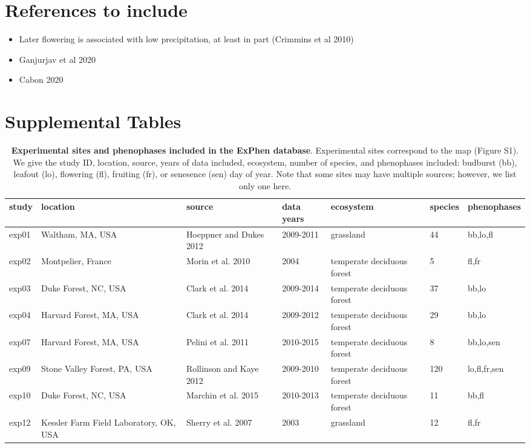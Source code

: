 \documentclass{article}
\begin{document}
\section*{References to include}
\begin{itemize}
\item Later flowering is  associated with low precipitation, at least in part (Crimmins et al 2010)
\item Ganjurjav et al 2020
\item Cabon 2020
\end{itemize}

\clearpage
\section* {Supplemental Tables}

\begin{table}[ht]
\centering
\caption{\textbf{Experimental sites and phenophases included in the ExPhen database}. Experimental sites correspond to the map (Figure S1). We give the study ID, location, source, years of data included, ecosystem, number of species, and phenophases included: budburst (bb), leafout (lo), flowering (fl), fruiting (fr), or senesence (sen) day of year. Note that some sites may have multiple sources; however, we list only one here.} 
\label{tab:studylocs}
\begingroup\footnotesize
\begin{tabular}{|p{}|p{}|p{}|p{}|p{}|p{}|p{}|}
  \hline
study & location & source & data years & ecosystem & species & phenophases \\ 
  \hline
exp01 & Waltham, MA, USA & Hoeppner and Dukes 2012 & 2009-2011 & grassland & 44 & bb,lo,fl \\ 
   \hline
exp02 & Montpelier, France & Morin et al. 2010 & 2004 & temperate deciduous forest & 5 & fl,fr \\ 
   \hline
exp03 & Duke Forest, NC, USA & Clark et al. 2014 & 2009-2014 & temperate deciduous forest & 37 & bb,lo \\ 
   \hline
exp04 & Harvard Forest, MA, USA & Clark et al. 2014 & 2009-2012 & temperate deciduous forest & 29 & bb,lo \\ 
   \hline
exp07 & Harvard Forest, MA, USA & Pelini et al. 2011 & 2010-2015 & temperate deciduous forest & 8 & bb,lo,sen \\ 
   \hline
exp09 & Stone Valley Forest, PA, USA & Rollinson and Kaye 2012 & 2009-2010 & temperate deciduous forest & 120 & lo,fl,fr,sen \\ 
   \hline
exp10 & Duke Forest, NC, USA & Marchin et al. 2015 & 2010-2013 & temperate deciduous forest & 11 & bb,fl \\ 
   \hline
exp12 & Kessler Farm Field Laboratory, OK, USA & Sherry et al. 2007 & 2003 & grassland & 12 & fl,fr \\ 
   \hline
\end{tabular}
\endgroup
\end{table}%
\end{document}
